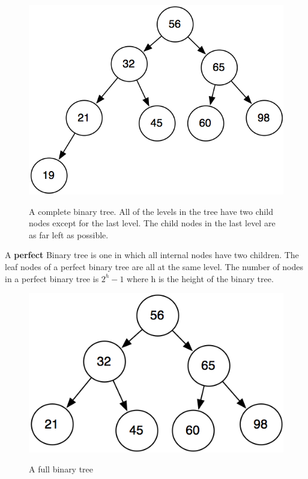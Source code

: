   \begin{figure}[H]
\centering
\includegraphics{pictures/completeTree.png}
\label{fig:fullTree}
\caption{A complete binary tree.  All of the levels in the tree have two child nodes except for the last level.  The child nodes in the 
last level are as far left as possible.}
\end{figure}

A \textbf{perfect} Binary tree is one in which all internal nodes have two children.   The leaf nodes of a perfect binary tree are all at the same level.
The number of nodes in a perfect binary tree is $2^h-1$ where h is the height of the binary tree.  

  \begin{figure}[H]
\centering
\includegraphics{pictures/perfectTree.png}
\label{fig:fullTree}
\caption{A full binary tree}
\end{figure}

